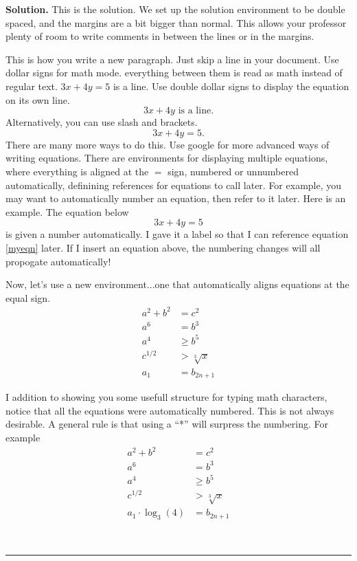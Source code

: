 \documentclass[10pt,leqno ]{article}
\theoremstyle{definition}
\newenvironment{solution}[1][Solution]{\begin{doublespace}\textbf{#1.}\quad }{\ \rule{0.5em}{0.5em}\end{doublespace}}
\begin{document}
\begin{solution}
This is the solution. We set up the solution environment to be double spaced, and the margins
are a bit bigger than normal. This allows your professor plenty of room to write comments
in between the lines or in the margins.

This is how you write a new paragraph. Just skip a line in your document.
Use dollar signs for math mode. everything between them is read as math instead
of regular text. $3x+4y=5$ is a line.
Use double dollar signs to display the equation on its own line. $$3x+4y \text{ is a line.}$$
Alternatively, you can use slash and brackets.
\[
3x+4y=5.
\]
There are many more ways to do this.
Use google for more advanced ways of writing equations. There are environments
for displaying multiple equations, where everything is aligned at the $=$ sign,
numbered or unnumbered automatically, definining references for equations to call later.
For example, you may want to automatically number an equation, then refer to it later.
Here is an example. The equation below
\begin{equation}\label{myeqn}
3x+4y=5
\end{equation}
is given a number automatically. I gave it a label so that I can reference 
equation \eqref{myeqn} later. If I insert an equation above, the numbering changes 
will all propogate automatically! 

Now, let's use a new environment...one that automatically aligns equations at the equal sign.
\begin{align}
a^2 + b^2 &= c^2 \\ %
a^6 &= b^3 \\ %
a^4 &\ge b^5\\ %
c^{1/2} &> \sqrt[3]{x}\\
a_1 &= b_{2n+1}
\end{align}

I addition to showing you some usefull structure for typing math characters, notice that
all the equations were automatically numbered. This is not always desirable. A general rule
is that using a ``*'' will surpress the numbering. For example
\begin{align*}
a^2 + b^2 &= c^2 \\ %
a^6 &= b^3 \\ %
a^4 &\ge b^5\\ %
c^{1/2} &> \sqrt[3]{x}\\
a_1\cdot \log_3 (4) &= b_{2n+1} %
\end{align*}


\end{solution}
\end{document}
